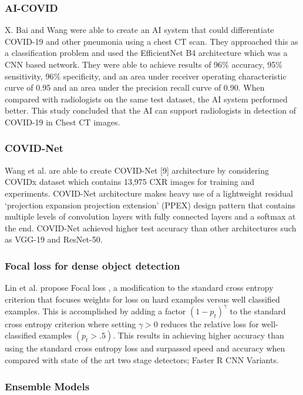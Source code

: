 \documentclass{sigkddExp}
\begin{document}
\subsubsection{AI-COVID}

X. Bai and Wang \cite{pmid32339081} were able to create an AI system that could
differentiate COVID-19 and other pneumonia using a chest CT scan. They
approached this as a classification problem and used the EfficientNet B4
architecture which was a CNN based network. They were able to achieve results of
96\% accuracy, 95\% sensitivity, 96\% specificity, and an area under receiver
operating characteristic curve of 0.95 and an area under the precision recall
curve of 0.90. When compared with radiologists on the same test dataset, the AI
system performed better. This study concluded that the AI can support
radiologists in detection of COVID-19 in Chest CT images.

\subsubsection{COVID-Net}

Wang et al. are able to create COVID-Net [9] architecture by
considering COVIDx dataset which contains 13,975 CXR images for training and
experiments. COVID-Net architecture makes heavy use of a lightweight residual
‘projection expansion projection extension’ (PPEX) design pattern that contains
multiple levels of convolution layers with fully connected layers and a softmax
at the end. COVID-Net achieved higher test accuracy than other architectures
such as VGG-19 and ResNet-50.


\subsubsection{Focal loss for dense object detection}

Lin et al. propose Focal loss \cite{lin2018focal}, a
modification to the standard cross entropy criterion that focuses weights for
loss on hard examples versus well classified examples. This is accomplished by
adding a factor $(1 - p_t)^\gamma$ to the standard cross entropy criterion where
setting $\gamma  > 0$ reduces the relative loss for well-classified examples
$(p_t > .5)$. This results in achieving higher accuracy than using the standard
cross entropy loss and surpassed speed and accuracy when compared with state of
the art two stage detectors; Faster R CNN Variants.

\subsubsection{Ensemble Models}
\end{document}
